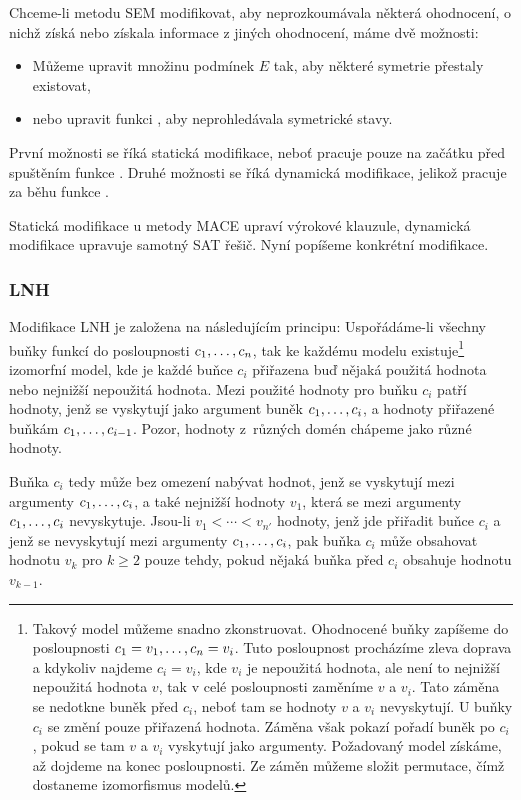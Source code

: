 Chceme-li metodu SEM modifikovat, aby neprozkoumávala některá
ohodnocení, o nichž získá nebo získala informace
z jiných ohodnocení, máme dvě možnosti:
\begin{itemize}
\item Můžeme upravit množinu podmínek $E$ tak,
  aby některé symetrie přestaly existovat,
\item nebo upravit funkci , aby
  neprohledávala symetrické stavy.
\end{itemize}
První možnosti se říká statická modifikace, neboť
pracuje pouze na začátku před spuštěním funkce .
Druhé možnosti se říká dynamická modifikace,
jelikož pracuje za běhu funkce .

Statická modifikace u metody MACE upraví výrokové klauzule,
dynamická modifikace upravuje samotný SAT řešič.
Nyní popíšeme konkrétní modifikace.

\subsubsection{LNH}

Modifikace LNH \cite{lnh} je založena na následujícím principu:
Uspořádáme-li všechny buňky funkcí do
posloupnosti $c_1 , \ldots, c_n$,
tak ke každému modelu existuje\footnote{
Takový model můžeme snadno zkonstruovat. Ohodnocené buňky
zapíšeme do posloupnosti $c_1 = v_1 , \ldots, c_n = v_i$.
Tuto posloupnost procházíme zleva doprava a kdykoliv
najdeme $c_i = v_i$, kde $v_i$ je nepoužitá hodnota, ale není to nejnižší
nepoužitá hodnota $v$, tak v celé posloupnosti zaměníme
$v$ a $v_i$. Tato záměna se nedotkne buněk před $c_i$,
neboť tam se hodnoty $v$ a $v_i$ nevyskytují. U buňky $c_i$ se změní
pouze přiřazená hodnota. Záměna však pokazí pořadí buněk po $c_i$,
pokud se tam $v$ a $v_i$ vyskytují jako argumenty.
Požadovaný model získáme, až dojdeme na konec posloupnosti.
Ze záměn můžeme složit permutace, čímž dostaneme izomorfismus modelů.}
izomorfní model,
kde je každé buňce $c_i$ přiřazena buď nějaká použitá hodnota
nebo nejnižší nepoužitá hodnota.
Mezi použité hodnoty pro buňku $c_i$ patří hodnoty, jenž se vyskytují
jako argument buněk $c_1 , \ldots, c_i$, a hodnoty
přiřazené buňkám $c_1 , \ldots, c_{i-1}$.
Pozor, hodnoty z~různých domén chápeme jako různé hodnoty.

Buňka $c_i$ tedy může bez omezení nabývat hodnot, jenž se vyskytují mezi
argumenty $c_1 , \ldots, c_i$, a také nejnižší hodnoty $v_1$, která se mezi
argumenty $c_1 , \ldots, c_i$ nevyskytuje.
Jsou-li $v_1 < \cdots < v_{n'}$ hodnoty, jenž jde přiřadit buňce $c_i$
a jenž se nevyskytují mezi argumenty $c_1 , \ldots, c_i$, pak
buňka $c_i$ může obsahovat hodnotu $v_k$ pro $k \ge 2$ pouze tehdy,
pokud nějaká buňka před $c_i$ obsahuje hodnotu $v_{k-1}$.

